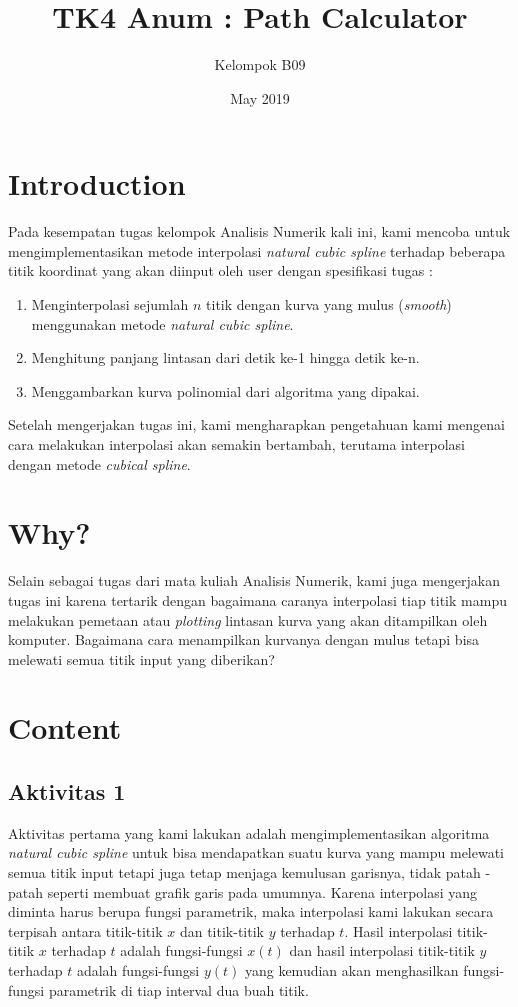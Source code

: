 \documentclass[11pt]{article}
\title{TK4 Anum : Path Calculator}
\author{Kelompok B09}
\date{May 2019}
\begin{document}
\maketitle

\section{Introduction}
Pada kesempatan tugas kelompok Analisis Numerik kali ini, kami mencoba untuk mengimplementasikan metode interpolasi \textit{natural cubic spline} terhadap beberapa titik koordinat yang akan diinput oleh user dengan spesifikasi tugas :

\begin{enumerate}
    \item Menginterpolasi sejumlah $n$ titik dengan kurva yang mulus (\textit{smooth}) menggunakan metode \textit{natural cubic spline}.
    \item Menghitung panjang lintasan dari detik ke-1 hingga detik ke-n.
    \item Menggambarkan kurva polinomial dari algoritma yang dipakai.
\end{enumerate}
\medskip
Setelah mengerjakan tugas ini, kami mengharapkan pengetahuan kami mengenai cara melakukan interpolasi akan semakin bertambah, terutama interpolasi dengan metode \textit{cubical spline}.

\section{Why?}
Selain sebagai tugas dari mata kuliah Analisis Numerik, kami juga mengerjakan tugas ini karena tertarik dengan bagaimana caranya interpolasi tiap titik mampu melakukan pemetaan atau \textit{plotting} lintasan kurva yang akan ditampilkan oleh komputer. Bagaimana cara menampilkan kurvanya dengan mulus tetapi bisa melewati semua titik input yang diberikan?

\section{Content}
\subsection{Aktivitas 1}

Aktivitas pertama yang kami lakukan adalah mengimplementasikan algoritma \textit{natural cubic spline} untuk bisa mendapatkan suatu kurva yang mampu melewati semua titik input tetapi juga tetap menjaga kemulusan garisnya, tidak patah - patah seperti membuat grafik garis pada umumnya. Karena interpolasi yang diminta harus berupa fungsi parametrik, maka interpolasi kami lakukan secara terpisah antara titik-titik $x$ dan titik-titik $y$ terhadap $t$. Hasil interpolasi titik-titik $x$ terhadap $t$ adalah fungsi-fungsi $x(t)$ dan hasil interpolasi titik-titik $y$ terhadap $t$ adalah fungsi-fungsi $y(t)$ yang kemudian akan menghasilkan fungsi-fungsi parametrik di tiap interval dua buah titik.
\end{document}
